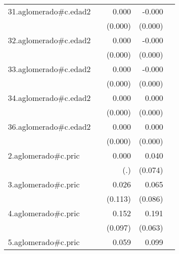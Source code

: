 {\begin{longtable}{l*{4}{D{.}{.}{-1}}}
\addlinespace
31.aglomerado#c.edad2&                     &       0.000         &      -0.000         &                     \\
            &                     &     (0.000)         &     (0.000)         &                     \\
\addlinespace
32.aglomerado#c.edad2&                     &       0.000         &      -0.000         &                     \\
            &                     &     (0.000)         &     (0.000)         &                     \\
\addlinespace
33.aglomerado#c.edad2&                     &       0.000         &      -0.000         &                     \\
            &                     &     (0.000)         &     (0.000)         &                     \\
\addlinespace
34.aglomerado#c.edad2&                     &       0.000\sym{*}  &       0.000         &                     \\
            &                     &     (0.000)         &     (0.000)         &                     \\
\addlinespace
36.aglomerado#c.edad2&                     &       0.000\sym{***}&       0.000\sym{*}  &                     \\
            &                     &     (0.000)         &     (0.000)         &                     \\
\addlinespace
2.aglomerado#c.pric&                     &       0.000         &       0.040         &                     \\
            &                     &         (.)         &     (0.074)         &                     \\
\addlinespace
3.aglomerado#c.pric&                     &       0.026         &       0.065         &                     \\
            &                     &     (0.113)         &     (0.086)         &                     \\
\addlinespace
4.aglomerado#c.pric&                     &       0.152         &       0.191\sym{**} &                     \\
            &                     &     (0.097)         &     (0.063)         &                     \\
\addlinespace
5.aglomerado#c.pric&                     &       0.059         &       0.099         &                     \\

\end{longtable}}
